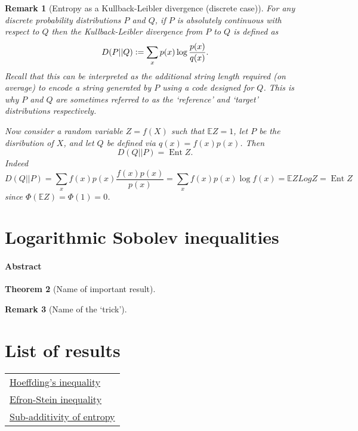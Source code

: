 \documentclass{amsproc}
\newtheorem{theorem}{Theorem}
\newtheorem{remark}[theorem]{Remark}
\newcommand{\defeq}{\vcentcolon=} %
\newcommand{\E}{\mathbb{E}} %
\DeclareMathOperator{\Ent}{Ent} %
\begin{document}
\begin{remark}[Entropy as a Kullback-Leibler divergence (discrete case)]
\label{rmk:entropy_as_KL_divergence}
	For any discrete probability distributions $P$ and $Q$, if $P$ is absolutely continuous with respect to $Q$ then the Kullback-Leibler divergence from $P$ to $Q$ is defined as
	$$D(P||Q) \defeq \sum_x p(x) \log \frac{p(x)}{q(x)}.$$
	Recall that this can be interpreted as the additional string length required (on average) to encode a string generated by $P$ using a code designed for $Q$.
	This is why $P$ and $Q$ are sometimes referred to as the `reference' and `target' distributions respectively.

	Now consider a random variable $Z=f(X)$ such that $\E Z=1$, let $P$ be the disribution of $X$, and let $Q$ be defined via $q(x) = f(x) p(x)$.
	Then $$D(Q||P) = \Ent Z.$$
	Indeed $$D(Q||P) = \sum_x f(x) p(x) \frac{f(x) p(x)}{p(x)} = \sum_x f(x) p(x) \log f(x) = \E Z Log Z = \Ent Z$$
	since $\Phi(\E Z) = \Phi(1) = 0$.
\end{remark}


\section{Logarithmic Sobolev inequalities}
\label{sec:log_Sob_ineq}
\paragraph{\textbf{Abstract}}

\begin{theorem}[Name of important result]
\label{thm:reference}
\end{theorem}

\begin{remark}[Name of the `trick']
\label{rmk:reference}
\end{remark}


\appendix
\newpage
\section*{List of results}
	\begin{tabular}{l}
		\hyperref[thm:hoeffding]{Hoeffding's inequality}\\
		\hyperref[thm:ESI]{Efron-Stein inequality}\\
		\hyperref[thm:sub_add_entropy]{Sub-additivity of entropy}\\
	\end{tabular}
\end{document}
